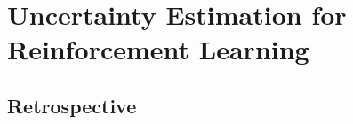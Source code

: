 \chapter{Uncertainty Estimation for Reinforcement Learning}
\label{chap:reinforcement_learning}










\section*{Retrospective}
%